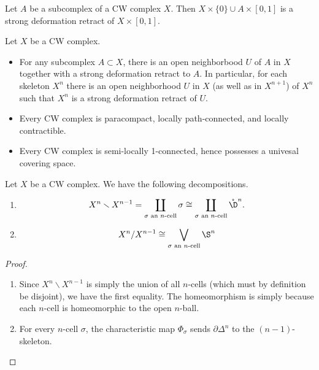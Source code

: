\documentclass[main.tex]{subfiles}
\begin{document}
\begin{proposition}
  Let $A$ be a subcomplex of a CW complex $X$. Then $X \times \{0\} \cup A \times [0, 1]$ is a strong deformation retract of $X \times [0, 1]$.
\end{proposition}

\begin{lemma}
  \label{lemma:unproved_properties_of_cw_complexes}
  Let $X$ be a CW complex.
  \begin{itemize}
    \item For any subcomplex $A \subset X$, there is an open neighborbood $U$ of $A$ in $X$ together with a strong deformation retract to $A$. In particular, for each skeleton $X^{n}$ there is an open neighborhood $U$ in $X$ (as well as in $X^{n+1}$) of $X^{n}$ such that $X^{n}$ is a strong deformation retract of $U$.

    \item Every CW complex is paracompact, locally path-connected, and locally contractible.

    \item Every CW complex is semi-locally 1-connected, hence possesses a univesal covering space.
  \end{itemize}
\end{lemma}

\begin{lemma}
  \label{lemma:difference_and_quotient_of_neighboring_skeleta}
  Let $X$ be a CW complex. We have the following decompositions.
  \begin{enumerate}
    \item
      \begin{equation*}
        X^{n} \smallsetminus X^{n-1} = \coprod_{\sigma \text{ an $n$-cell}} \sigma \cong \coprod_{\sigma \text{ an $n$-cell}} \mathring{\D}^{n}.
      \end{equation*}

    \item
      \begin{equation*}
        X^{n}/X^{n-1} \cong \bigvee_{\sigma\text{ an $n$-cell}} \S^{n}
      \end{equation*}
  \end{enumerate}
\end{lemma}
\begin{proof}
  \leavevmode
  \begin{enumerate}
    \item Since $X^{n} \smallsetminus X^{n-1}$ is simply the union of all $n$-cells (which must by definition be disjoint), we have the first equality. The homeomorphism is simply because each $n$-cell is homeomorphic to the open $n$-ball.

    \item For every $n$-cell $\sigma$, the characteristic map $\Phi_{\sigma}$ sends $\partial \Delta^{n}$ to the $(n-1)$-skeleton.
  \end{enumerate}
\end{proof}
\end{document}
